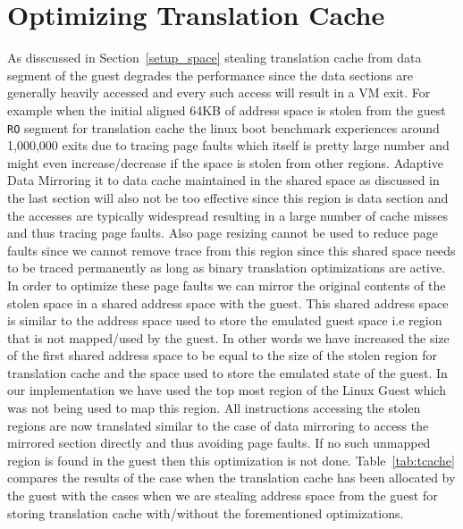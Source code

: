 \section{Optimizing Translation Cache}
\label{tcache_optimizations}
As disscussed in Section~\ref{setup_space} stealing translation cache from data segment of the guest degrades the performance since the data sections are generally heavily accessed and every such access will result in a VM exit. For example when the initial aligned 64KB of address space is stolen from the guest {\tt RO} segment for translation cache the linux boot benchmark experiences around 1,000,000 exits due to tracing page faults which itself is pretty large number and might even increase/decrease if the space is stolen from other regions. Adaptive Data Mirroring it to data cache maintained in the shared space as discussed in the last section will also not be too effective since this region is data section and the accesses are typically widespread resulting in a large number of cache misses and thus tracing page faults. Also page resizing cannot be used to reduce page faults since we cannot remove trace from this region since this shared space needs to be traced permanently as long as binary translation optimizations are active.
In order to optimize these page faults we can mirror the original contents of the stolen space in a shared address space with the guest. This shared address space is similar to the address space used to store the emulated guest space i.e region that is not mapped/used by the guest. In other words we have increased the size of the first shared address space to be equal to the size of the stolen region for translation cache and the space used to store the emulated state of the guest. In our implementation we have used the top most region of the Linux Guest which was not being used to map this region. All instructions accessing the stolen regions are now translated similar to the case of data mirroring to access the mirrored section directly and thus avoiding page faults. If no such unmapped region is found in the guest then this optimization is not done. Table~\ref{tab:tcache} compares the results of the case when the translation cache has been allocated by the guest with the cases when we are stealing address space from the guest for storing translation cache with/without the forementioned optimizations.

